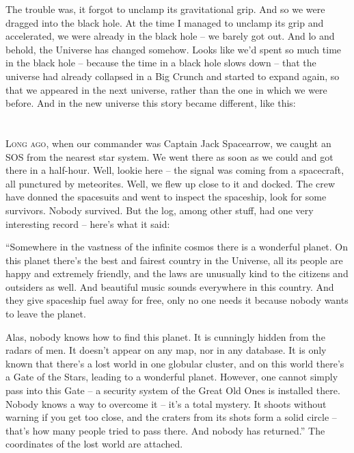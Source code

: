 \documentclass[ebook,twoside,final,openright]{memoir}
\begin{document}
The trouble was, it forgot to unclamp its gravitational grip. And so we were dragged into the black hole. At the time I managed to unclamp its grip and accelerated, we were already in the black hole – we barely got out. And lo and behold, the Universe has changed somehow. Looks like we’d spent so much time in the black hole – because the time in a black hole slows down – that the universe had already collapsed in a Big Crunch and started to expand again, so that we appeared in the next universe, rather than the one in which we were before. And in the new universe this story became different, like this:
\chapter{}
\par
\lettrine{L}{ong ago,} when our commander was Captain Jack Spacearrow, we caught an SOS from the nearest star system. We went there as soon as we could and got there in a half-hour. Well, lookie here – the signal was coming from a spacecraft, all punctured by meteorites. Well, we flew up close to it and docked. The crew have donned the spacesuits and went to inspect the spaceship, look for some survivors. Nobody survived. But the log, among other stuff, had one very interesting record – here’s what it said:\par
\par
“Somewhere in the vastness of the infinite cosmos there is a wonderful planet. On this planet there’s the best and fairest country in the Universe, all its people are happy and extremely friendly, and the laws are unusually kind to the citizens and outsiders as well. And beautiful music sounds everywhere in this country. And they give spaceship fuel away for free, only no one needs it because nobody wants to leave the planet. \par
Alas, nobody knows how to find this planet. It is cunningly hidden from the radars of men. It doesn’t appear on any map, nor in any database. It is only known that there’s a lost world in one globular cluster, and on this world there’s a Gate of the Stars, leading to a wonderful planet. However, one cannot simply pass into this Gate – a security system of the Great Old Ones is installed there. Nobody knows a way to overcome it – it’s a total mystery. It shoots without warning if you get too close, and the craters from its shots form a solid circle – that's how many people tried to pass there. And nobody has returned.” The coordinates of the lost world are attached.\par
\end{document}
